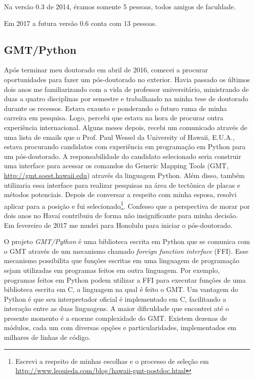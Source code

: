 Na versão 0.3 de 2014, éramos somente 5 pessoas, todos amigos de faculdade.

Em 2017 a futura versão 0.6 conta com 13 pessoas.


\subsection{GMT/Python}

Após terminar meu doutorado em abril de 2016, comecei a procurar oportunidades
para fazer um pós-doutorado no exterior.
Havia passado os últimos dois anos me familiarizando com a vida de professor
universitário, ministrando de duas a quatro disciplinas por semestre e
trabalhando na minha tese de doutorado durante os recessos.
Estava exausto e ponderando o futuro ruma de minha carreira em pesquisa.
Logo, percebi que estava na hora de procurar outra experiência internacional.
Alguns meses depois, recebi um comunicado através de uma lista de emails que o
Prof. Paul Wessel da University of Hawaii, E.U.A., estava procurando candidatos
com experiência em programação em Python para um pós-doutorado.
A responsabilidade do candidato selecionado seria construir uma interface
para acessar os comandos do Generic Mapping Tools (GMT,
\url{http://gmt.soest.hawaii.edu}) através da linguagem Python.
Além disso, também utilizaria essa interface para realizar pesquisas na área de
tectônica de placas e métodos potenciais.
Depois de conversar a respeito com minha esposa, resolvi aplicar para a
posição e fui selecionado\footnote{Escrevi a respeito de minhas escolhas e o
processo de seleção em
\url{http://www.leouieda.com/blog/hawaii-gmt-postdoc.html}}.
Confesso que a perspectiva de morar por dois anos no Havaí contribuiu
de forma não insignificante para minha decisão.
Em fevereiro de 2017 me mudei para Honolulu para iniciar o pós-doutorado.

O projeto \textit{GMT/Python} é uma biblioteca escrita em Python que se
comunica com o GMT através de um mecanismo chamado \textit{foreign function
interface} (FFI).
Esse mecanismo possibilita que funções escritas em uma linguagem de programação
sejam utilizadas em programas feitos em outra linguagem.
Por exemplo, programas feitos em Python podem utilizar a FFI para executar
funções de uma biblioteca escrita em C, a linguagem na qual é feito o GMT.
Um vantagem do Python é que seu interpretador oficial é implementado em C,
facilitando a interação entre as duas linguagens.
A maior dificuldade que encontrei até o presente momento é a enorme
complexidade do GMT.
Existem dezenas de módulos, cada um com diversas opções e particularidades,
implementados em milhares de linhas de código.

